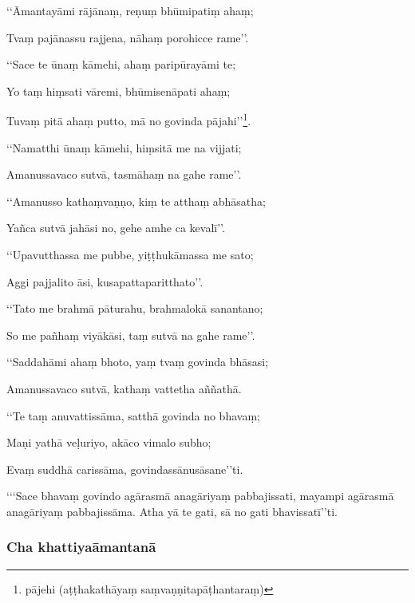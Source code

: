‘‘Āmantayāmi rājānaṃ, reṇuṃ bhūmipatiṃ ahaṃ;

Tvaṃ pajānassu rajjena, nāhaṃ porohicce rame’’.

‘‘Sace te ūnaṃ kāmehi, ahaṃ paripūrayāmi te;

Yo taṃ hiṃsati vāremi, bhūmisenāpati ahaṃ;

Tuvaṃ pitā ahaṃ putto, mā no govinda pājahi’’\footnote{pājehi (aṭṭhakathāyaṃ saṃvaṇṇitapāṭhantaraṃ)}.

‘‘Namatthi ūnaṃ kāmehi, hiṃsitā me na vijjati;

Amanussavaco sutvā, tasmāhaṃ na gahe rame’’.

‘‘Amanusso kathaṃvaṇṇo, kiṃ te atthaṃ abhāsatha;

Yañca sutvā jahāsi no, gehe amhe ca kevalī’’.

‘‘Upavutthassa me pubbe, yiṭṭhukāmassa me sato;

Aggi pajjalito āsi, kusapattaparitthato’’.

‘‘Tato me brahmā pāturahu, brahmalokā sanantano;

So me pañhaṃ viyākāsi, taṃ sutvā na gahe rame’’.

‘‘Saddahāmi ahaṃ bhoto, yaṃ tvaṃ govinda bhāsasi;

Amanussavaco sutvā, kathaṃ vattetha aññathā.

‘‘Te taṃ anuvattissāma, satthā govinda no bhavaṃ;

Maṇi yathā veḷuriyo, akāco vimalo subho;

Evaṃ suddhā carissāma, govindassānusāsane’’ti.

‘‘‘Sace bhavaṃ govindo agārasmā anagāriyaṃ pabbajissati, mayampi agārasmā anagāriyaṃ pabbajissāma. Atha yā te gati, sā no gati bhavissatī’’ti.

\subsubsection{Cha khattiyaāmantanā}

